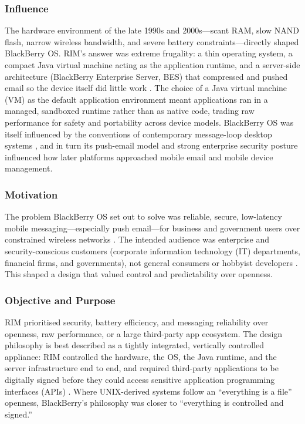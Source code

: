 \subsubsection{Influence}
The hardware environment of the late 1990s and 2000s---scant
RAM, slow NAND flash, narrow wireless bandwidth, and severe battery
constraints---directly shaped BlackBerry OS. RIM's answer was extreme
frugality: a thin operating system, a compact Java virtual machine
acting as the application runtime, and a server-side architecture
(BlackBerry Enterprise Server, BES) that compressed and pushed email so
the device itself did little work \citep{historytools2024}. The
choice of a Java virtual machine (VM) as the default application
environment meant
applications ran in a managed, sandboxed runtime rather than as native
code, trading raw performance for safety and portability across device
models. BlackBerry OS was itself influenced by the conventions of
contemporary message-loop desktop systems \citep{rim950manual}, and
in turn its push-email model and strong enterprise security posture
influenced how later platforms approached mobile email and mobile device
management.

\subsubsection{Motivation}
The problem BlackBerry OS set out to solve was reliable, secure,
low-latency mobile messaging---especially push email---for business and
government users over constrained wireless networks
\citep{historytools2024}. The intended audience was enterprise and
security-conscious customers (corporate information technology (IT)
departments, financial firms,
and governments), not general consumers or hobbyist developers
\citep{historytools2024}. This shaped a design that valued control
and predictability over openness.

\subsubsection{Objective and Purpose}
RIM prioritised security, battery efficiency, and messaging reliability
over openness, raw performance, or a large third-party app ecosystem.
The design philosophy is best described as a tightly integrated,
vertically controlled appliance: RIM controlled the hardware, the OS,
the Java runtime, and the server infrastructure end to end, and required
third-party applications to be digitally signed before they could access
sensitive application programming interfaces (APIs)
\citep{tutorialspoint_bbsec, withsecure2012}. Where
UNIX-derived systems follow an ``everything is a file'' openness,
BlackBerry's philosophy was closer to ``everything is controlled and
signed.''
